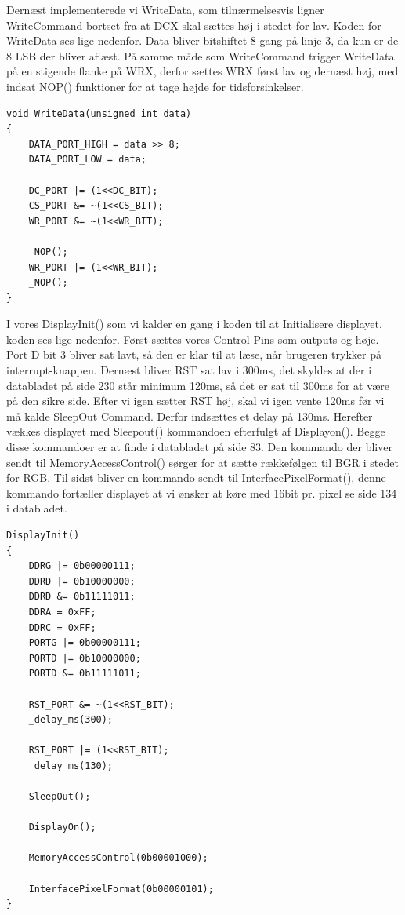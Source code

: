 Dernæst implementerede vi WriteData, som tilnærmelsesvis ligner WriteCommand bortset fra at DCX skal sættes høj i stedet for lav. Koden for WriteData ses lige nedenfor. Data bliver bitshiftet 8 gang på linje 3, da kun er de 8 LSB der bliver aflæst. På samme måde som WriteCommand trigger WriteData på en stigende flanke på WRX, derfor sættes WRX først lav og dernæst høj, med indsat NOP() funktioner for at tage højde for tidsforsinkelser. 

\begin{lstlisting}
void WriteData(unsigned int data)
{
	DATA_PORT_HIGH = data >> 8;
	DATA_PORT_LOW = data;

	DC_PORT |= (1<<DC_BIT);
	CS_PORT &= ~(1<<CS_BIT);
	WR_PORT &= ~(1<<WR_BIT);

	_NOP();
	WR_PORT |= (1<<WR_BIT);
	_NOP();
}
\end{lstlisting}


I vores DisplayInit() som vi kalder en gang i koden til at Initialisere displayet, koden ses lige nedenfor. Først sættes vores Control Pins som outputs og høje. Port D bit 3 bliver sat lavt, så den er klar til at læse, når brugeren trykker på interrupt-knappen. Dernæst bliver RST sat lav i 300ms, det skyldes at der i databladet\cite{man:ILI9341} på side 230 står minimum 120ms, så det er sat til 300ms for at være på den sikre side. Efter vi igen sætter RST høj, skal vi igen vente 120ms før vi må kalde SleepOut Command. Derfor indsættes et delay på 130ms. Herefter vækkes displayet med Sleepout() kommandoen efterfulgt af Displayon(). Begge disse kommandoer er at finde i databladet\cite{man:ILI9341} på side 83. Den kommando der bliver sendt til MemoryAccessControl() sørger for at sætte rækkefølgen til BGR i stedet for RGB. Til sidst bliver en kommando sendt til InterfacePixelFormat(), denne kommando fortæller displayet at vi ønsker at køre med 16bit pr. pixel se side 134 i databladet\cite{man:ILI9341}. 


\begin{lstlisting}
DisplayInit()
{
	DDRG |= 0b00000111;
	DDRD |= 0b10000000;
	DDRD &= 0b11111011;
	DDRA = 0xFF;
	DDRC = 0xFF;
	PORTG |= 0b00000111;
	PORTD |= 0b10000000;
	PORTD &= 0b11111011;
	
	RST_PORT &= ~(1<<RST_BIT);
	_delay_ms(300);

	RST_PORT |= (1<<RST_BIT);
	_delay_ms(130);
	
	SleepOut();

	DisplayOn();

	MemoryAccessControl(0b00001000);
	
	InterfacePixelFormat(0b00000101);
}
\end{lstlisting}



